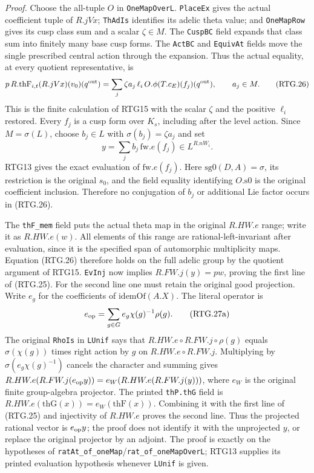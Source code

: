 \emph{Proof.}
Choose the all-tuple $O$ in \texttt{OneMapOverL}.
\texttt{PlaceEx} gives the actual coefficient tuple of $R.jVx$;
\texttt{ThAdIs} identifies its adelic theta value; and
\texttt{OneMapRow} gives its cusp class sum and a scalar $\zeta\in M$.
The \texttt{CuspBC} field expands that class sum into finitely many
base cusp forms.  The \texttt{ActBC} and \texttt{EquivAt} fields move
the single prescribed central action through the expansion.  Thus the
actual equality, at every quotient representative, is
\[
 p\,R.\mathrm{thF}_{i,t}(R.jVx)(v_0)(q^{\rm out})
    =\sum_j\zeta a_j\,\ell_i\,
             O.\phi(T.c_E)(f_j)(q^{\rm out}),\qquad a_j\in M.
                                                               \tag{RTG.26}
\]
This is the finite calculation of RTG15 with the scalar
$\zeta$ and the positive $\ell_i$ restored.  Every $f_j$ is a cusp
form over $K_s$, including after the level action.
Since $M=\sigma(L)$, choose $b_j\in L$ with
$\sigma(b_j)=\zeta a_j$ and set
\[
 y=\sum_j b_j\,\mathrm{fw}.e(f_j)\in L^{R.nW_i}.              \tag{RTG.27}
\]
RTG13 gives the exact evaluation of $\mathrm{fw}.e(f_j)$.
Here $\mathrm{sg0}(D,A)=\sigma$, its restriction is the original
$s_0$, and the field equality identifying $O.\mathrm{s0}$ is the
original coefficient inclusion.  Therefore no conjugation of $b_j$
or additional Lie factor occurs in (RTG.26).

The \texttt{thF\_\allowbreak mem} field puts the actual theta map in the original
$R.HW.e$ range; write it as $R.HW.e(w)$.  All elements of this range
are rational-left-invariant after evaluation, since it is the specified
span of automorphic multiplicity maps.  Equation (RTG.26) therefore
holds on the full adelic group by the quotient argument of RTG15.
\texttt{EvInj} now implies $R.FW.j(y)=p w$, proving the first line
of (RTG.25).  For the second line one must retain the original good projection.
Write $e_g$ for the coefficients of $\mathrm{idemOf}(A.X)$.
The literal operator is
\[
 e_{\rm op}=\sum_{g\in G}e_g\chi(g)^{-1}\rho(g).
 \tag{RTG.27a}
\]
The original \texttt{RhoIs} in \texttt{LUnif} says that
$R.HW.e\circ R.FW.j\circ\rho(g)$ equals $\sigma(\chi(g))$
times right action by $g$ on $R.HW.e\circ R.FW.j$.
Multiplying by $\sigma(e_g\chi(g)^{-1})$ cancels the character
and summing gives
$R.HW.e(R.FW.j(e_{\rm op}y))=e_W(R.HW.e(R.FW.j(y)))$,
where $e_W$ is the original finite group-algebra projector.
The printed \texttt{thP.thG} field is
$R.HW.e(\mathrm{thG}(x))=e_W(\mathrm{thF}(x))$.
Combining it with the first line of (RTG.25) and injectivity of
$R.HW.e$ proves the second line.  Thus the projected rational vector
is $e_{\rm op}y$; the proof does not identify it with the unprojected
$y$, or replace the original projector by an adjoint.
The proof is exactly on the hypotheses of
\texttt{ratAt\_\allowbreak of\_\allowbreak oneMap}/\texttt{rat\_\allowbreak of\_\allowbreak oneMapOverL}; RTG13
supplies its printed evaluation hypothesis whenever \texttt{LUnif}
is given.

